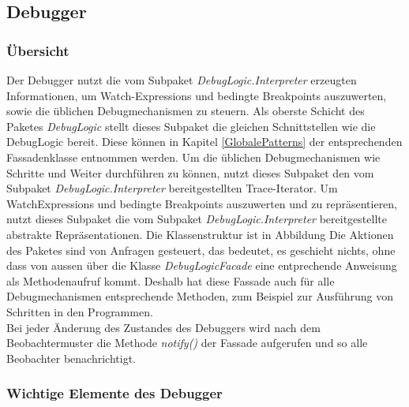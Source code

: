 \documentclass[parskip=full]{scrartcl}
\begin{document}
\subsection{Debugger}
\subsubsection{Übersicht}
Der Debugger nutzt die vom Subpaket \textit{DebugLogic.Interpreter} erzeugten Informationen, um Watch-Expressions und bedingte Breakpoints auszuwerten, sowie die üblichen Debugmechanismen zu steuern.
Als oberste Schicht des Paketes \textit{DebugLogic} stellt dieses Subpaket die gleichen Schnittstellen wie die DebugLogic bereit. Diese können in Kapitel \ref{GlobalePatterns} der entsprechenden Fassadenklasse entnommen werden.
Um die üblichen Debugmechanismen wie Schritte und Weiter durchführen zu können, nutzt dieses Subpaket den vom Subpaket \textit{DebugLogic.Interpreter} bereitgestellten Trace-Iterator. 
Um WatchExpressions und bedingte Breakpoints auszuwerten und zu repräsentieren, nutzt dieses Subpaket die vom Subpaket \textit{DebugLogic.Interpreter} bereitgestellte abstrakte Repräsentationen.
Die Klassenstruktur ist in Abbildung %
Die Aktionen des Paketes sind von Anfragen gesteuert, das bedeutet, es geschieht nichts, ohne dass von aussen über die Klasse \textit{DebugLogicFacade} eine entprechende Anweisung als Methodenaufruf kommt. Deshalb hat diese Fassade auch für alle Debugmechanismen entsprechende Methoden, zum Beispiel zur Ausführung von Schritten in den Programmen. \\
Bei jeder Änderung des Zustandes des Debuggers wird nach dem Beobachtermuster die Methode \textit{notify()} der Fassade aufgerufen und so alle Beobachter benachrichtigt.
\subsubsection{Wichtige Elemente des Debugger}
\end{document}
